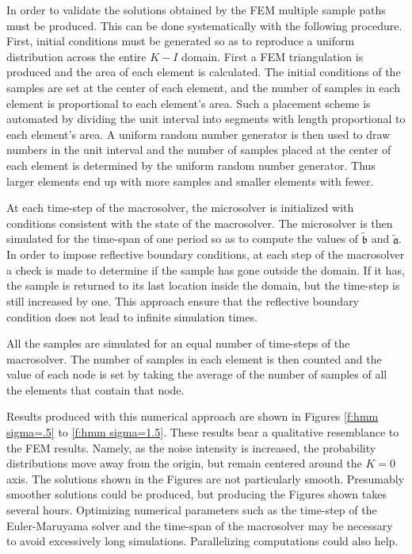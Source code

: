 In order to validate the solutions obtained by the FEM multiple sample paths must be produced. This can be done systematically with the following procedure. First, initial conditions must be generated so as to reproduce a uniform distribution across the entire $K-I$ domain. First a FEM triangulation is produced and the area of each element is calculated. The initial conditions of the samples are set at the center of each element, and the number of samples in each element is proportional to each element's area. Such a placement scheme is automated by dividing the unit interval into segments with length proportional to each element's area. A uniform random number generator is then used to draw numbers in the unit interval and the number of samples placed at the center of each element is determined by the uniform random number generator. Thus larger elements end up with more samples and smaller elements with fewer.

At each time-step of the macrosolver, the microsolver is initialized with conditions consistent with the state of the macrosolver. The microsolver is then simulated for the time-span of one period so as to compute the values of $\tilde{\mathfrak b}$ and $\tilde{\mathfrak a}$. In order to impose reflective boundary conditions, at each step of the macrosolver a check is made to determine if the sample has gone outside the domain. If it has, the sample is returned to its last location inside the domain, but the time-step is still increased by one. This approach ensure that the reflective boundary condition does not lead to infinite simulation times.


All the samples are simulated for an equal number of time-steps of the macrosolver. The number of samples in each element is then counted and the value of each node is set by taking the average of the number of samples of all the elements that contain that node.


Results produced with this numerical approach are shown in Figures \ref{f:hmm sigma=.5} to \ref{f:hmm sigma=1.5}. These results bear a qualitative resemblance to the FEM results. Namely, as the noise intensity is increased, the probability distributions move away from the origin, but remain centered around the $K=0$ axis. The solutions shown in the Figures are not particularly smooth. Presumably smoother solutions could be produced, but producing the Figures shown takes several hours. Optimizing numerical parameters such as the time-step of the Euler-Maruyama solver and the time-span of the macrosolver may be necessary to avoid excessively long simulations. Parallelizing computations could also help.

